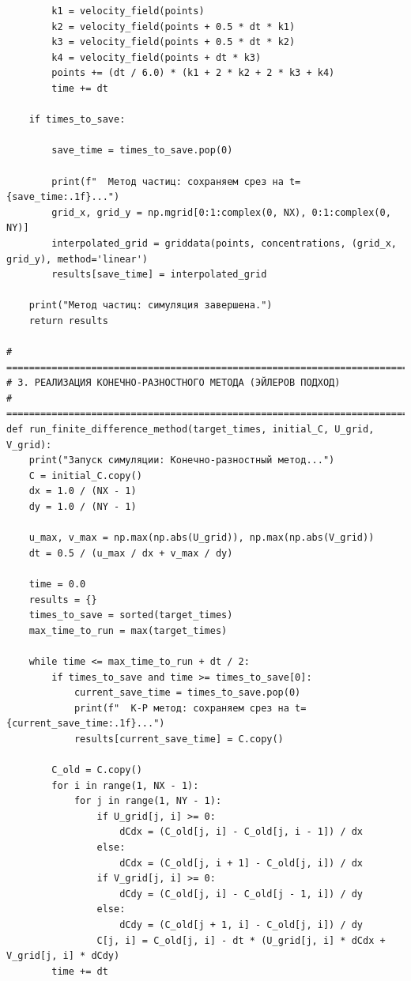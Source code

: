 \documentclass[a4paper,12pt]{article}
\begin{document}
\begin{verbatim}
        k1 = velocity_field(points)
        k2 = velocity_field(points + 0.5 * dt * k1)
        k3 = velocity_field(points + 0.5 * dt * k2)
        k4 = velocity_field(points + dt * k3)
        points += (dt / 6.0) * (k1 + 2 * k2 + 2 * k3 + k4)
        time += dt

    if times_to_save:

        save_time = times_to_save.pop(0)

        print(f"  Метод частиц: сохраняем срез на t={save_time:.1f}...")
        grid_x, grid_y = np.mgrid[0:1:complex(0, NX), 0:1:complex(0, NY)]
        interpolated_grid = griddata(points, concentrations, (grid_x, grid_y), method='linear')
        results[save_time] = interpolated_grid

    print("Метод частиц: симуляция завершена.")
    return results

# =============================================================================
# 3. РЕАЛИЗАЦИЯ КОНЕЧНО-РАЗНОСТНОГО МЕТОДА (ЭЙЛЕРОВ ПОДХОД)
# =============================================================================
def run_finite_difference_method(target_times, initial_C, U_grid, V_grid):
    print("Запуск симуляции: Конечно-разностный метод...")
    C = initial_C.copy()
    dx = 1.0 / (NX - 1)
    dy = 1.0 / (NY - 1)

    u_max, v_max = np.max(np.abs(U_grid)), np.max(np.abs(V_grid))
    dt = 0.5 / (u_max / dx + v_max / dy)
    
    time = 0.0
    results = {}
    times_to_save = sorted(target_times)
    max_time_to_run = max(target_times)
    
    while time <= max_time_to_run + dt / 2:
        if times_to_save and time >= times_to_save[0]:
            current_save_time = times_to_save.pop(0)
            print(f"  К-Р метод: сохраняем срез на t={current_save_time:.1f}...")
            results[current_save_time] = C.copy()

        C_old = C.copy()
        for i in range(1, NX - 1):
            for j in range(1, NY - 1):
                if U_grid[j, i] >= 0:
                    dCdx = (C_old[j, i] - C_old[j, i - 1]) / dx
                else:
                    dCdx = (C_old[j, i + 1] - C_old[j, i]) / dx
                if V_grid[j, i] >= 0:
                    dCdy = (C_old[j, i] - C_old[j - 1, i]) / dy
                else:
                    dCdy = (C_old[j + 1, i] - C_old[j, i]) / dy
                C[j, i] = C_old[j, i] - dt * (U_grid[j, i] * dCdx + V_grid[j, i] * dCdy)
        time += dt


\end{verbatim}
\end{document}
